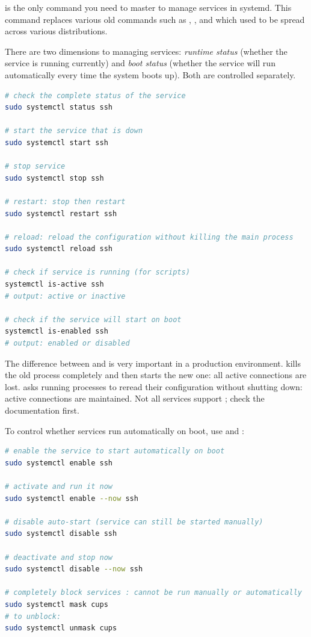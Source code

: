  is the only command you need to master to manage services in systemd. This command replaces various old commands such as , , and  which used to be spread across various distributions.

There are two dimensions to managing services: \textit{runtime status} (whether the service is running currently) and \textit{boot status} (whether the service will run automatically every time the system boots up). Both are controlled separately.

\begin{lstlisting}[language=bash, caption={Basic systemctl commands for service runtime}]
# check the complete status of the service
sudo systemctl status ssh

# start the service that is down
sudo systemctl start ssh

# stop service
sudo systemctl stop ssh

# restart: stop then restart
sudo systemctl restart ssh

# reload: reload the configuration without killing the main process
sudo systemctl reload ssh

# check if service is running (for scripts)
systemctl is-active ssh
# output: active or inactive

# check if the service will start on boot
systemctl is-enabled ssh
# output: enabled or disabled
\end{lstlisting}

The difference between  and  is very important in a production environment.  kills the old process completely and then starts the new one: all active connections are lost.  asks running processes to reread their configuration without shutting down: active connections are maintained. Not all services support ; check the documentation first.

To control whether services run automatically on boot, use  and :

\begin{lstlisting}[language=bash, caption={Controls auto-start of services at boot time}]
# enable the service to start automatically on boot
sudo systemctl enable ssh

# activate and run it now
sudo systemctl enable --now ssh

# disable auto-start (service can still be started manually)
sudo systemctl disable ssh

# deactivate and stop now
sudo systemctl disable --now ssh

# completely block services : cannot be run manually or automatically
sudo systemctl mask cups
# to unblock:
sudo systemctl unmask cups
\end{lstlisting}

